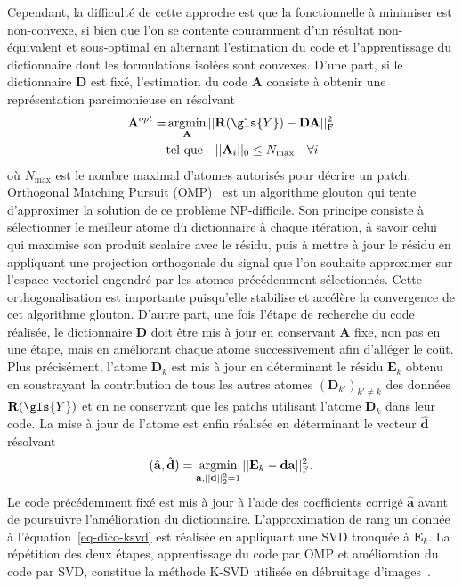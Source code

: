 %
Cependant, la difficulté de cette approche est que la fonctionnelle à minimiser est non-convexe, si bien que l'on se contente couramment d'un résultat non-équivalent et sous-optimal en alternant l'estimation du code et l'apprentissage du dictionnaire dont les formulations isolées sont convexes.
%
D'une part, si le dictionnaire $\mathbf{D}$ est fixé, l'estimation du code $\mathbf{A}$ consiste à obtenir une représentation parcimonieuse en résolvant 
\begin{align}
    \mathbf{A}^{opt} = &\argmin_{\mathbf{A}} \frobnorm{ \mathbf{R}(\gls{Y}) - \mathbf{DA}}\\
    &\text{tel que}
    \quad
    ||\mathbf{A}_i||_0 \leq N_{\mathrm{max}}\quad\forall i
\end{align}
où $N_{\mathrm{max}}$ est le nombre maximal d'atomes autorisés pour décrire un patch. Orthogonal Matching Pursuit (OMP)~\cite{mallat1993matching, pati1993orthogonal} est un algorithme glouton qui tente d'approximer la solution de ce problème NP-difficile. Son principe consiste à sélectionner le meilleur atome du dictionnaire à chaque itération, à savoir celui qui maximise son produit scalaire avec le résidu, puis à mettre à jour le résidu en appliquant une projection orthogonale du signal que l'on souhaite approximer sur l'espace vectoriel engendré par les atomes précédemment sélectionnés. Cette orthogonalisation est importante puisqu'elle stabilise et accélère la convergence de cet algorithme glouton.
%
D'autre part, une fois l'étape de recherche du code réalisée, le dictionnaire $\mathbf{D}$ doit être mis à jour en conservant $\mathbf{A}$ fixe, non pas en une étape, mais en améliorant chaque atome successivement afin d'alléger le coût. Plus précisément, l'atome $\mathbf{D}_k$ est mis à jour en déterminant le résidu $\mathbf{E}_k$ obtenu en soustrayant la contribution de tous les autres atomes $(\mathbf{D}_{k'})_{k'\neq k}$  des données $\mathbf{R}(\gls{Y})$ et en ne conservant que les patchs utilisant l'atome $\mathbf{D}_k$ dans leur code. La mise à jour de l'atome est enfin réalisée en déterminant le vecteur $\hat{\mathbf{d}}$ résolvant
\begin{equation}\label{eq-dico-ksvd}
    (\hat{\mathbf{a}}, \hat{\mathbf{d}}) = \argmin_{\mathbf{a}, \twonorm{\mathbf{d}}=1} \frobnorm{\mathbf{E}_k-\mathbf{da}}.
\end{equation}
Le code précédemment fixé est mis à jour à l'aide des coefficients corrigé $\hat{\mathbf{a}}$ avant de poursuivre l'amélioration du dictionnaire. L'approximation de rang un donnée à l'équation~\eqref{eq-dico-ksvd} est réalisée en appliquant une SVD tronquée à $\mathbf{E}_k$. La répétition des deux étapes, apprentissage du code par OMP et amélioration du code par SVD, constitue la méthode K-SVD utilisée en débruitage d'images~\cite{elad2006image}.

